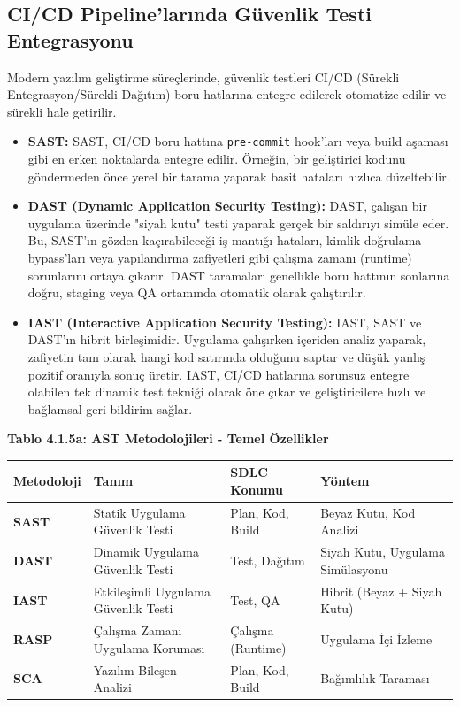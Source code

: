 \subsection{CI/CD Pipeline'larında Güvenlik Testi Entegrasyonu}
Modern yazılım geliştirme süreçlerinde, güvenlik testleri CI/CD (Sürekli Entegrasyon/Sürekli Dağıtım) boru hatlarına entegre edilerek otomatize edilir ve sürekli hale getirilir.
\begin{itemize}
\item \textbf{SAST:} SAST, CI/CD boru hattına \texttt{pre-commit} hook'ları veya build aşaması gibi en erken noktalarda entegre edilir. Örneğin, bir geliştirici kodunu göndermeden önce yerel bir tarama yaparak basit hataları hızlıca düzeltebilir.
\item \textbf{DAST (Dynamic Application Security Testing):} DAST, çalışan bir uygulama üzerinde "siyah kutu" testi yaparak gerçek bir saldırıyı simüle eder. Bu, SAST'ın gözden kaçırabileceği iş mantığı hataları, kimlik doğrulama bypass'ları veya yapılandırma zafiyetleri gibi çalışma zamanı (runtime) sorunlarını ortaya çıkarır. DAST taramaları genellikle boru hattının sonlarına doğru, staging veya QA ortamında otomatik olarak çalıştırılır.
\item \textbf{IAST (Interactive Application Security Testing):} IAST, SAST ve DAST'ın hibrit birleşimidir. Uygulama çalışırken içeriden analiz yaparak, zafiyetin tam olarak hangi kod satırında olduğunu saptar ve düşük yanlış pozitif oranıyla sonuç üretir. IAST, CI/CD hatlarına sorunsuz entegre olabilen tek dinamik test tekniği olarak öne çıkar ve geliştiricilere hızlı ve bağlamsal geri bildirim sağlar.
\end{itemize}
\begin{center}
\textbf{Tablo 4.1.5a: AST Metodolojileri - Temel Özellikler}

\begin{tabularx}{0.95\textwidth}{|>{\raggedright\arraybackslash}X|>{\raggedright\arraybackslash}X|>{\centering\arraybackslash}X|>{\centering\arraybackslash}X|}
\hline
\textbf{Metodoloji} & \textbf{Tanım} & \textbf{SDLC Konumu} & \textbf{Yöntem} \\
\hline
\textbf{SAST} & Statik Uygulama Güvenlik Testi & Plan, Kod, Build & Beyaz Kutu, Kod Analizi \\
\hline
\textbf{DAST} & Dinamik Uygulama Güvenlik Testi & Test, Dağıtım & Siyah Kutu, Uygulama Simülasyonu \\
\hline
\textbf{IAST} & Etkileşimli Uygulama Güvenlik Testi & Test, QA & Hibrit (Beyaz + Siyah Kutu) \\
\hline
\textbf{RASP} & Çalışma Zamanı Uygulama Koruması & Çalışma (Runtime) & Uygulama İçi İzleme \\
\hline
\textbf{SCA} & Yazılım Bileşen Analizi & Plan, Kod, Build & Bağımlılık Taraması \\
\hline
\end{tabularx}
\end{center}

